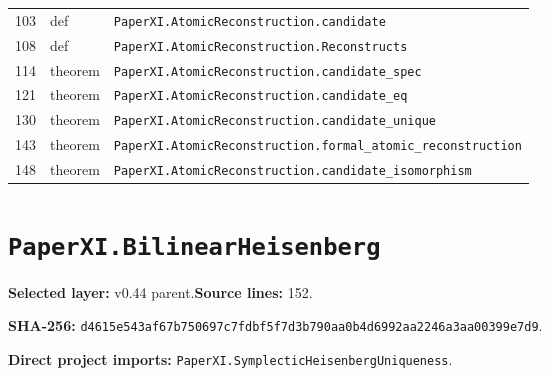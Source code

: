 \documentclass[10pt,oneside]{book}
\begin{document}
\begin{longtable}{@{}p{}p{}p{}@{}}
103&def&\nolinkurl{PaperXI.AtomicReconstruction.candidate}\\

108&def&\nolinkurl{PaperXI.AtomicReconstruction.Reconstructs}\\

114&theorem&\nolinkurl{PaperXI.AtomicReconstruction.candidate_spec}\\

121&theorem&\nolinkurl{PaperXI.AtomicReconstruction.candidate_eq}\\

130&theorem&\nolinkurl{PaperXI.AtomicReconstruction.candidate_unique}\\

143&theorem&\nolinkurl{PaperXI.AtomicReconstruction.formal_atomic_reconstruction}\\

148&theorem&\nolinkurl{PaperXI.AtomicReconstruction.candidate_isomorphism}\\

\bottomrule\end{longtable}

\section{\texorpdfstring{\nolinkurl{PaperXI.BilinearHeisenberg}}{PaperXI.BilinearHeisenberg}}\label{module:PaperXI.BilinearHeisenberg}

\textbf{Selected layer:} v0.44 parent.\quad\textbf{Source lines:} 152.\par\textbf{SHA-256:} {\scriptsize\nolinkurl{d4615e543af67b750697c7fdbf5f7d3b790aa0b4d6992aa2246a3aa00399e7d9}}.


\textbf{Direct project imports:} \nolinkurl{PaperXI.SymplecticHeisenbergUniqueness}.
\end{document}
